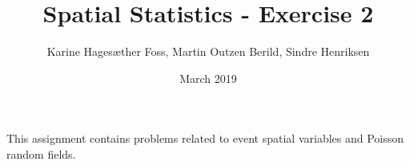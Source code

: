 \documentclass[11pt,a4paper,oneside]{article}
\title{Spatial Statistics - Exercise 2}
\author{Karine Hagesæther Foss, Martin Outzen Berild, Sindre Henriksen}
\date{March 2019}
\begin{document}
    \maketitle
    This assignment contains problems related to event spatial variables and Poisson random fields.
    
    
    
    
\end{document}
